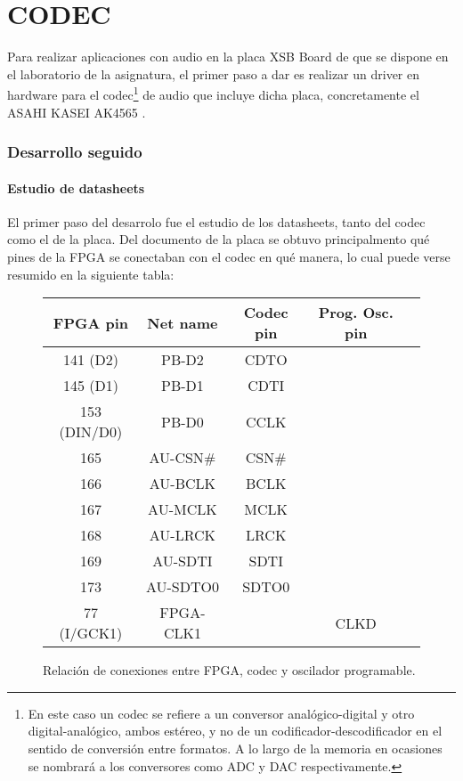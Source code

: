 \part{CODEC}

Para realizar aplicaciones con audio en la placa XSB Board \cite{XSBBoard} de que se dispone en el laboratorio de la asignatura, el primer paso a dar es realizar un driver en hardware para el codec\footnote{En este caso un codec se refiere a un conversor analógico-digital y otro digital-analógico, ambos estéreo, y no de un codificador-descodificador en el sentido de conversión entre formatos. A lo largo de la memoria en ocasiones se nombrará a los conversores como ADC y DAC respectivamente.} de audio que incluye dicha placa, concretamente el ASAHI KASEI AK4565 \cite{AK4565}.

	
	
\section{Desarrollo seguido}

	\subsection{Estudio de datasheets}
		El primer paso del desarrolo fue el estudio de los datasheets, tanto del codec como el de la placa. Del documento de la placa se obtuvo principalmento qué pines de la FPGA se conectaban con el codec en qué manera, lo cual puede verse resumido en la siguiente tabla:


\begin{figure}[H]

\centering
	\begin{tabular}{|c|c|c|c|c|}
		\hline
		\textbf{FPGA pin} & \textbf{Net name} & \textbf{Codec pin} & \textbf{Prog. Osc. pin}\\
		\hline
		141 (D2) & PB-D2 & CDTO &\\
		\hline
		145 (D1) & PB-D1 & CDTI &\\
		\hline
		153 (DIN/D0) & PB-D0 & CCLK &\\
		\hline
		165 & AU-CSN\# & CSN\# &\\
		\hline
		166 &  AU-BCLK & BCLK &\\
		\hline
		167 &  AU-MCLK & MCLK &\\
		\hline
		168 &  AU-LRCK & LRCK &\\
		\hline
		169 &  AU-SDTI & SDTI &\\
		\hline
		173 &  AU-SDTO0 & SDTO0 &\\
		\hline
		77 (I/GCK1) & FPGA-CLK1 & & CLKD\\
		\hline
	\end{tabular}

  \caption{Relación de conexiones entre FPGA, codec y oscilador programable.}
\end{figure}


